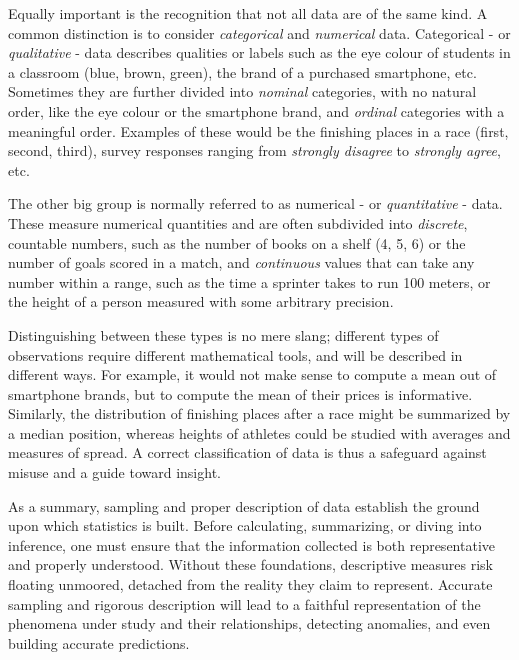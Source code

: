 \documentclass{book}
\begin{document}
\medskip

Equally important is the recognition that not all data are of the same kind. A common distinction is to  consider \textit{categorical} and \textit{numerical} data. Categorical - or \textit{qualitative} -  data describes qualities or labels such as the eye colour of students in a classroom (blue, brown, green), the brand of a purchased smartphone, etc. Sometimes they are further divided into \textit{nominal} categories, with no natural order, like the eye colour or the smartphone brand, and \textit{ordinal} categories with a meaningful order. Examples of these would be the finishing places in a race (first, second, third), survey responses ranging from \textit{strongly disagree} to \textit{strongly agree}, etc.

\medskip

The other big group is normally referred to as numerical - or \textit{quantitative} - data. These measure numerical quantities and are often subdivided into \textit{discrete}, countable numbers, such as the number of books on a shelf (4, 5, 6) or the number of goals scored in a match, and \textit{continuous} values that can take any number within a range, such as the time a sprinter takes to run 100 meters, or the height of a person measured with some arbitrary precision.

\medskip

Distinguishing between these types is no mere slang; different types of observations require different mathematical tools, and will be described in different ways. For example, it would not make sense to compute a mean out of smartphone brands, but to compute the mean of their prices is informative. Similarly, the distribution of finishing places after a race might be summarized by a median position, whereas heights of athletes could be studied with averages and measures of spread. A correct classification of data is thus a safeguard against misuse and a guide toward insight.

\medskip

As a summary, sampling and proper description of data establish the ground upon which statistics is built. Before calculating, summarizing, or diving into inference, one must ensure that the information collected is both representative and properly understood. Without these foundations, descriptive measures risk floating unmoored, detached from the reality they claim to represent. Accurate sampling and rigorous description will lead to a faithful representation of the phenomena under study and their relationships, detecting anomalies, and even building accurate predictions.
\end{document}
